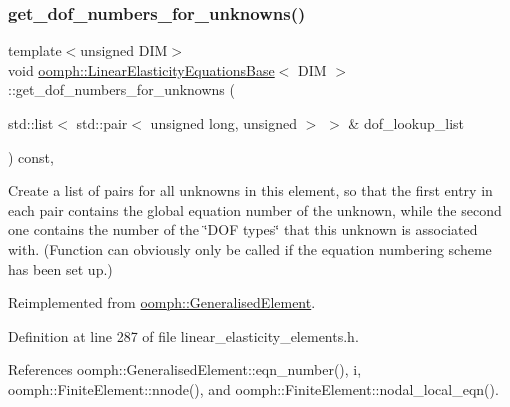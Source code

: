 \subsubsection{\texorpdfstring{get\+\_\+dof\+\_\+numbers\+\_\+for\+\_\+unknowns()}{get\_dof\_numbers\_for\_unknowns()}}
{\footnotesize\ttfamily template$<$unsigned D\+IM$>$ \\
void \hyperlink{classoomph_1_1LinearElasticityEquationsBase}{oomph\+::\+Linear\+Elasticity\+Equations\+Base}$<$ D\+IM $>$\+::get\+\_\+dof\+\_\+numbers\+\_\+for\+\_\+unknowns (\begin{DoxyParamCaption}\item[{std\+::list$<$ std\+::pair$<$ unsigned long, unsigned $>$ $>$ \&}]{dof\+\_\+lookup\+\_\+list }\end{DoxyParamCaption}) const\hspace{0.3cm}{\ttfamily [inline]}, {\ttfamily [virtual]}}



Create a list of pairs for all unknowns in this element, so that the first entry in each pair contains the global equation number of the unknown, while the second one contains the number of the \char`\"{}\+D\+O\+F types\char`\"{} that this unknown is associated with. (Function can obviously only be called if the equation numbering scheme has been set up.) 



Reimplemented from \hyperlink{classoomph_1_1GeneralisedElement_a069f59bfc3e607a5bebba52c6314d777}{oomph\+::\+Generalised\+Element}.



Definition at line 287 of file linear\+\_\+elasticity\+\_\+elements.\+h.



References oomph\+::\+Generalised\+Element\+::eqn\+\_\+number(), i, oomph\+::\+Finite\+Element\+::nnode(), and oomph\+::\+Finite\+Element\+::nodal\+\_\+local\+\_\+eqn().

\mbox{\label{classoomph_1_1LinearElasticityEquationsBase_a6abe4e64b421290d95bf8e6b5c99eae7}} 
